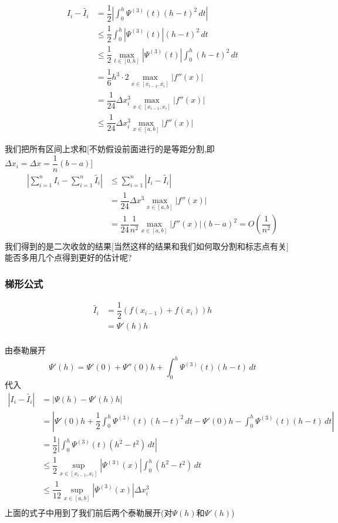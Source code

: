 \documentclass[11pt,hyperref,a4paper,UTF8]{ctexart}
\newcommand{\abs}[1]{\left|#1\right|}
\begin{document}
\begin{CJK}{UTF8}{gkai}
\[
\begin{aligned}
  I_i - \tilde{I_i} &= \dfrac{1}{2} \abs{\int_{0}^{h}\varPsi^{(3)} (t)(h -t)^2\, dt}\\
  &\leq \dfrac{1}{2} \int_{0}^{h}\abs{\varPsi^{(3)}(t)}(h -t)^2\, dt\\
  &\leq \dfrac{1}{2} \max_{t\in[0,h]}\abs{\varPsi^{(3)}(t)}\int_{0}^{h}(h -t)^2\, dt\\
  &= \dfrac{1}{6}h^3 \cdot 2 \max_{x\in[x_{i - 1},x_{i}]}|f''(x)|\\
  &= \dfrac{1}{24}\Delta x_i^3\max_{x\in[x_{i - 1},x_{i}]}|f''(x)|\\
  &\leq \dfrac{1}{24}\Delta x_i^3\max_{x\in[a,b]}|f''(x)|\
\end{aligned}
\]

我们把所有区间上求和[不妨假设前面进行的是等距分割,即$\Delta x_i = \Delta x = \dfrac{1}{n}(b - a)$]
\[
\begin{aligned}
  \abs{\sum_{i = 1}^{n} I_i - \sum_{i = 1}^{n} \tilde{I_i}} &\leq \sum_{i = 1}^{n}|I_i - \tilde{I_i}|\\
  &= \dfrac{1}{24}\Delta x^3\max_{x\in[a,b]}|f''(x)|\\
  &= \dfrac{1}{24}\dfrac{1}{n^2} \max_{x\in[a,b]}|f''(x)| (b - a)^2 = O(\dfrac{1}{n^2})\\
\end{aligned}
\]
我们得到的是二次收敛的结果[当然这样的结果和我们如何取分割和标志点有关]\\

能否多用几个点得到更好的估计呢?
\subsubsection{梯形公式}

\[
  \begin{aligned}
    \tilde{I_i} &= \dfrac{1}{2}(f(x_{i - 1}) + f(x_i)) h\\
    &=\varPsi'(h) h\\
  \end{aligned}
\]

由泰勒展开
\[\varPsi'(h) = \varPsi'(0) + \varPsi''(0)h + \int_{0}^{h}\varPsi^{(3)}(t)(h - t)\, dt\]
代入
\[
  \begin{aligned}
    \abs{I_i - \tilde{I_i}} &= \abs{\varPsi(h) - \varPsi'(h) h}\\
    &=\abs{\varPsi'(0)h + \dfrac{1}{2}\int_{0}^{h}\varPsi^{(3)}(t)(h - t)^2\, dt - \varPsi'(0)h - \int_{0}^{h}\varPsi^{(3)}(t)(h - t)\, dt}\\
    &=\dfrac{1}{2} \abs{\int_{0}^{h}\varPsi^{(3)}(t)(h^2 - t^2)\, dt} \\
    &\leq\dfrac{1}{2} \sup_{x\in[x_{i - 1},x_i]}\abs{\varPsi^{(3)}(x)} \int_{0}^{h}(h^2 - t^2)\, dt \\
    &\leq\dfrac{1}{12} \sup_{x\in[a,b]}\abs{\varPsi^{(3)}(x)}\Delta x_i^3 \\
  \end{aligned}
\]
上面的式子中用到了我们前后两个泰勒展开(对$\varPsi(h)$和$\varPsi'(h)$)


\end{CJK}
\end{document}
